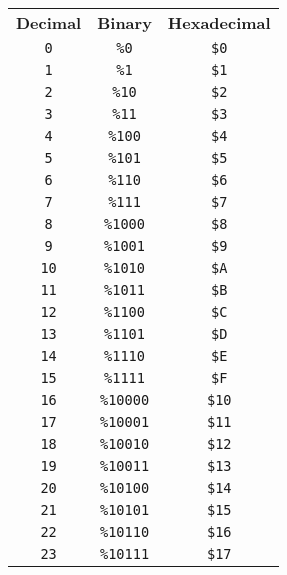 \begin{multicols}{2}
\begin{center}
	\begin{tabular}{|c|c|c|}
	\hline
		\textbf{Decimal} & \textbf{Binary} & \textbf{Hexadecimal} \\ \hhline{|=|=|=|}   
	\texttt{0} & \texttt{\%0} &  \texttt{\$0} \\ \hline
  \texttt{1} & \texttt{\%1} &  \texttt{\$1} \\ \hline
  \texttt{2} & \texttt{\%10} &  \texttt{\$2} \\ \hline
  \texttt{3} & \texttt{\%11} &  \texttt{\$3} \\ \hline
  \texttt{4} & \texttt{\%100} &  \texttt{\$4} \\ \hline
  \texttt{5} & \texttt{\%101} &  \texttt{\$5} \\ \hline
  \texttt{6} & \texttt{\%110} &  \texttt{\$6} \\ \hline
  \texttt{7} & \texttt{\%111} &  \texttt{\$7} \\ \hline
  \texttt{8} & \texttt{\%1000} &  \texttt{\$8} \\ \hline
  \texttt{9} & \texttt{\%1001} &  \texttt{\$9} \\ \hline
  \texttt{10} & \texttt{\%1010} &  \texttt{\$A} \\ \hline
  \texttt{11} & \texttt{\%1011} &  \texttt{\$B} \\ \hline
  \texttt{12} & \texttt{\%1100} &  \texttt{\$C} \\ \hline
  \texttt{13} & \texttt{\%1101} &  \texttt{\$D} \\ \hline
  \texttt{14} & \texttt{\%1110} &  \texttt{\$E} \\ \hline
  \texttt{15} & \texttt{\%1111} &  \texttt{\$F} \\ \hline
  \texttt{16} & \texttt{\%10000} &  \texttt{\$10} \\ \hline
  \texttt{17} & \texttt{\%10001} &  \texttt{\$11} \\ \hline
  \texttt{18} & \texttt{\%10010} &  \texttt{\$12} \\ \hline
  \texttt{19} & \texttt{\%10011} &  \texttt{\$13} \\ \hline
  \texttt{20} & \texttt{\%10100} &  \texttt{\$14} \\ \hline
  \texttt{21} & \texttt{\%10101} &  \texttt{\$15} \\ \hline
  \texttt{22} & \texttt{\%10110} &  \texttt{\$16} \\ \hline
  \texttt{23} & \texttt{\%10111} &  \texttt{\$17} \\ \hline

\end{tabular}
\end{center}
\end{multicols}
